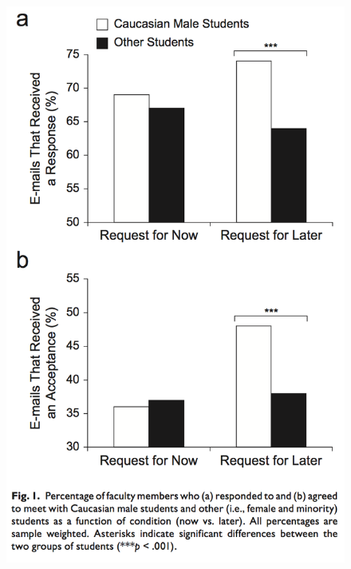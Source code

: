 \documentclass[aspectratio=169]{beamer}
\begin{document}
\begin{frame}

\begin{figure}
  \centering
  \includegraphics[height=0.8\textheight]{figures/milkman_temporal_2012_fig1.png}
\end{figure}

\end{frame}
\end{document}
